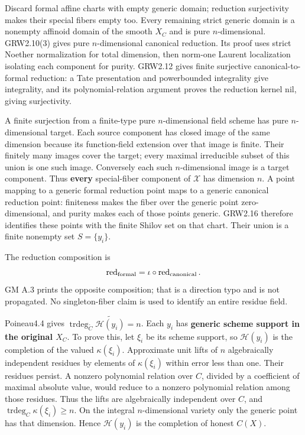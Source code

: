 \documentclass[
  11pt,
]{article}
\begin{document}
Discard formal affine charts with empty generic domain; reduction
surjectivity makes their special fibers empty too. Every remaining
strict generic domain is a nonempty affinoid domain of the smooth
\(X_C\) and is pure \(n\)-dimensional. GRW2.10(3) gives pure
\(n\)-dimensional canonical reduction. Its proof uses strict Noether
normalization for total dimension, then norm-one Laurent localization
isolating each component for purity. GRW2.12 gives finite surjective
canonical-to-formal reduction: a Tate presentation and powerbounded
integrality give integrality, and its polynomial-relation argument
proves the reduction kernel nil, giving surjectivity.

A finite surjection from a finite-type pure \(n\)-dimensional field
scheme has pure \(n\)-dimensional target. Each source component has
closed image of the same dimension because its function-field extension
over that image is finite. Their finitely many images cover the target;
every maximal irreducible subset of this union is one such image.
Conversely each such \(n\)-dimensional image is a target component. Thus
\textbf{every} special-fiber component of \(\mathcal X\) has dimension
\(n\). A point mapping to a generic formal reduction point maps to a
generic canonical reduction point: finiteness makes the fiber over the
generic point zero-dimensional, and purity makes each of those points
generic. GRW2.16 therefore identifies these points with the finite
Shilov set on that chart. Their union is a finite nonempty set
\(S=\{y_i\}\).

The reduction composition is \[
 \operatorname{red}_{\rm formal}=\iota\circ
 \operatorname{red}_{\rm canonical}.
\] GM A.3 prints the opposite composition; that is a direction typo and
is not propagated. No singleton-fiber claim is used to identify an
entire residue field.

Poineau4.4 gives
\(\operatorname{trdeg}_{\widetilde C}\widetilde{\mathcal H(y_i)}=n\).
Each \(y_i\) has \textbf{generic scheme support in the original
\(X_C\)}. To prove this, let \(\xi_i\) be its scheme support, so
\(\mathcal H(y_i)\) is the completion of the valued \(\kappa(\xi_i)\).
Approximate unit lifts of \(n\) algebraically independent residues by
elements of \(\kappa(\xi_i)\) within error less than one. Their residues
persist. A nonzero polynomial relation over \(C\), divided by a
coefficient of maximal absolute value, would reduce to a nonzero
polynomial relation among those residues. Thus the lifts are
algebraically independent over \(C\), and
\(\operatorname{trdeg}_C\kappa(\xi_i)\geq n\). On the integral
\(n\)-dimensional variety only the generic point has that dimension.
Hence \(\mathcal H(y_i)\) is the completion of honest \(C(X)\).
\end{document}
